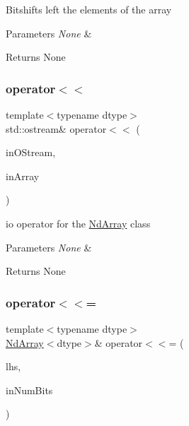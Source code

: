 Bitshifts left the elements of the array


\begin{DoxyParams}{Parameters}
{\em None} & \\
\hline
\end{DoxyParams}
\begin{DoxyReturn}{Returns}
None 
\end{DoxyReturn}
\mbox{\label{class_num_cpp_1_1_nd_array_a7bc4555bca4773adf8f4e51ca73c13ed}} 
\subsubsection{\texorpdfstring{operator$<$$<$}{operator<<}\hspace{0.1cm}{\footnotesize\ttfamily [2/2]}}
{\footnotesize\ttfamily template$<$typename dtype$>$ \\
std\+::ostream\& operator$<$$<$ (\begin{DoxyParamCaption}\item[{std\+::ostream \&}]{in\+O\+Stream,  }\item[{const \mbox{\hyperlink{class_num_cpp_1_1_nd_array}{Nd\+Array}}$<$ dtype $>$ \&}]{in\+Array }\end{DoxyParamCaption})\hspace{0.3cm}{\ttfamily [friend]}}

io operator for the \mbox{\hyperlink{class_num_cpp_1_1_nd_array}{Nd\+Array}} class


\begin{DoxyParams}{Parameters}
{\em None} & \\
\hline
\end{DoxyParams}
\begin{DoxyReturn}{Returns}
None 
\end{DoxyReturn}
\mbox{\label{class_num_cpp_1_1_nd_array_ad35a1fb99d88618e4446403e9f77d228}} 
\subsubsection{\texorpdfstring{operator$<$$<$=}{operator<<=}}
{\footnotesize\ttfamily template$<$typename dtype$>$ \\
\mbox{\hyperlink{class_num_cpp_1_1_nd_array}{Nd\+Array}}$<$dtype$>$\& operator$<$$<$= (\begin{DoxyParamCaption}\item[{\mbox{\hyperlink{class_num_cpp_1_1_nd_array}{Nd\+Array}}$<$ dtype $>$ \&}]{lhs,  }\item[{\mbox{\hyperlink{namespace_num_cpp_aee396d0469d6031cd18118c0a45bcdda}{uint8}}}]{in\+Num\+Bits }\end{DoxyParamCaption})\hspace{0.3cm}{\ttfamily [friend]}}


